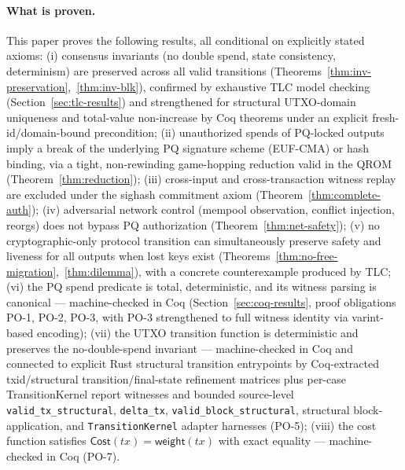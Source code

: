 \documentclass[11pt]{article}
\newcommand{\Cost}{\mathsf{Cost}}
\newcommand{\weight}{\mathsf{weight}}
\begin{document}
\paragraph{What is proven.}
This paper proves the following results, all conditional on explicitly stated axioms:
(i) consensus invariants (no double spend, state consistency, determinism) are preserved across all valid transitions (Theorems~\ref{thm:inv-preservation},~\ref{thm:inv-blk}), confirmed by exhaustive TLC model checking (Section~\ref{sec:tlc-results}) and strengthened for structural UTXO-domain uniqueness and total-value non-increase by Coq theorems under an explicit fresh-id/domain-bound precondition;
(ii) unauthorized spends of PQ-locked outputs imply a break of the underlying PQ signature scheme (EUF-CMA) or hash binding, via a tight, non-rewinding game-hopping reduction valid in the QROM (Theorem~\ref{thm:reduction});
(iii) cross-input and cross-transaction witness replay are excluded under the sighash commitment axiom (Theorem~\ref{thm:complete-auth});
(iv) adversarial network control (mempool observation, conflict injection, reorgs) does not bypass PQ authorization (Theorem~\ref{thm:net-safety});
(v) no cryptographic-only protocol transition can simultaneously preserve safety and liveness for all outputs when lost keys exist (Theorems~\ref{thm:no-free-migration},~\ref{thm:dilemma}), with a concrete counterexample produced by TLC;
(vi) the PQ spend predicate is total, deterministic, and its witness parsing is canonical --- machine-checked in Coq (Section~\ref{sec:coq-results}, proof obligations PO-1, PO-2, PO-3, with PO-3 strengthened to full witness identity via varint-based encoding);
(vii) the UTXO transition function is deterministic and preserves the no-double-spend invariant --- machine-checked in Coq and connected to explicit Rust structural transition entrypoints by Coq-extracted txid/structural transition/final-state refinement matrices plus per-case TransitionKernel report witnesses and bounded source-level \texttt{valid\_tx\_structural}, \texttt{delta\_tx}, \texttt{valid\_block\_structural}, structural block-application, and \texttt{TransitionKernel} adapter harnesses (PO-5);
(viii) the cost function satisfies $\Cost(tx) = \weight(tx)$ with exact equality --- machine-checked in Coq (PO-7).
\end{document}
